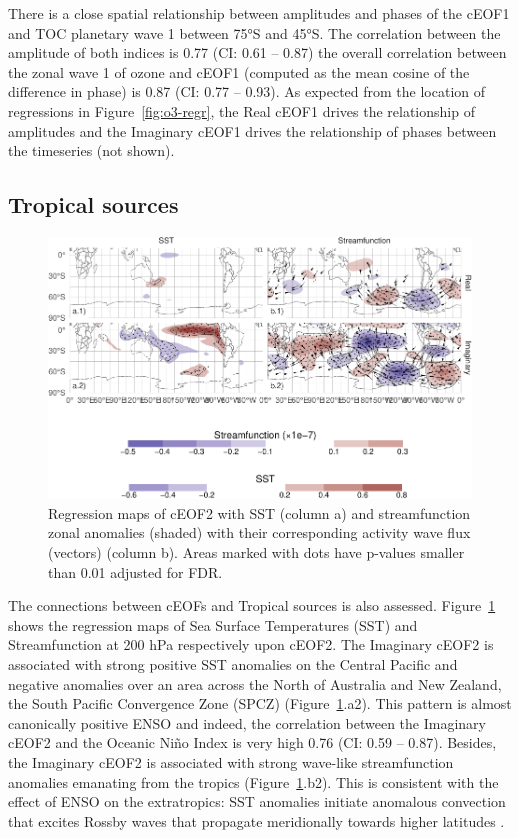 \documentclass[smallextended]{svjour3}       %
\begin{document}
There is a close spatial relationship between amplitudes and phases of the cEOF1 and TOC planetary wave 1 between 75°S and 45°S.
The correlation between the amplitude of both indices is 0.77 (CI: 0.61 -- 0.87) the overall correlation between the zonal wave 1 of ozone and cEOF1 (computed as the mean cosine of the difference in phase) is 0.87 (CI: 0.77 -- 0.93).
As expected from the location of regressions in Figure~\ref{fig:o3-regr}, the Real cEOF1 drives the relationship of amplitudes and the Imaginary cEOF1 drives the relationship of phases between the timeseries (not shown).

\hypertarget{tropical}{%
\subsection{Tropical sources}\label{tropical}}



\begin{figure}
\includegraphics{../figures/sst-psi-2-1} \caption{Regression maps of cEOF2 with SST (column a) and streamfunction zonal anomalies (shaded) with their corresponding activity wave flux (vectors) (column b). Areas marked with dots have p-values smaller than 0.01 adjusted for FDR.}\label{fig:sst-psi-2}
\end{figure}

The connections between cEOFs and Tropical sources is also assessed.
Figure~\ref{fig:sst-psi-2} shows the regression maps of Sea Surface Temperatures (SST) and Streamfunction at 200 hPa respectively upon cEOF2. The Imaginary cEOF2 is associated with strong positive SST anomalies on the Central Pacific and negative anomalies over an area across the North of Australia and New Zealand, the South Pacific Convergence Zone (SPCZ) (Figure~\ref{fig:sst-psi-2}.a2). This pattern is almost canonically positive ENSO \citep{bamston1997} and indeed, the correlation between the Imaginary cEOF2 and the Oceanic Niño Index \citep{bamston1997} is very high 0.76 (CI: 0.59 -- 0.87).
Besides, the Imaginary cEOF2 is associated with strong wave-like streamfunction anomalies emanating from the tropics (Figure~\ref{fig:sst-psi-2}.b2). This is consistent with the effect of ENSO on the extratropics: SST anomalies initiate anomalous convection that excites Rossby waves that propagate meridionally towards higher latitudes \citep{mo2000}.
\end{document}
